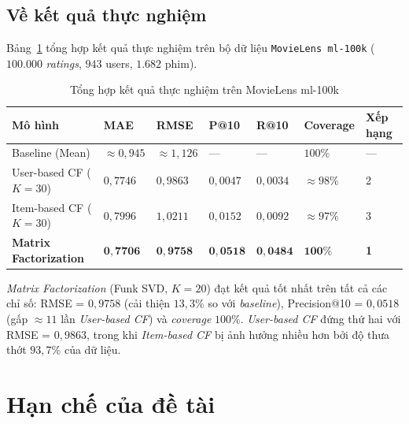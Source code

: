 \documentclass[../BTL.tex]{subfiles}
\begin{document}
\subsection{Về kết quả thực nghiệm}
\label{section:4.1.3}

Bảng~\ref{tab:summary} tổng hợp kết quả thực nghiệm trên bộ dữ liệu
\texttt{MovieLens ml-100k} ($100.000$ \textit{ratings}, $943$ users,
$1.682$ phim).

\begin{table}[H]
    \centering
    \caption{Tổng hợp kết quả thực nghiệm trên MovieLens ml-100k}
    \label{tab:summary}
    \begin{tabular}{lllllll}
        \toprule
        \textbf{Mô hình}
            & \textbf{MAE} & \textbf{RMSE}
            & \textbf{P@10} & \textbf{R@10}
            & \textbf{Coverage} & \textbf{Xếp hạng} \\
        \midrule
        Baseline (Mean)
            & ${\approx}0{,}945$ & ${\approx}1{,}126$
            & --- & ---
            & $100\%$ & --- \\
        User-based CF ($K=30$)
            & $0{,}7746$ & $0{,}9863$
            & $0{,}0047$ & $0{,}0034$
            & ${\approx}98\%$ & 2 \\
        Item-based CF ($K=30$)
            & $0{,}7996$ & $1{,}0211$
            & $0{,}0152$ & $0{,}0092$
            & ${\approx}97\%$ & 3 \\
        \textbf{Matrix Factorization}
            & $\mathbf{0{,}7706}$ & $\mathbf{0{,}9758}$
            & $\mathbf{0{,}0518}$ & $\mathbf{0{,}0484}$
            & $\mathbf{100\%}$ & \textbf{1} \\
        \bottomrule
    \end{tabular}
\end{table}

\textit{Matrix Factorization} (Funk SVD, $K=20$) đạt kết quả tốt nhất trên
tất cả các chỉ số: RMSE = $0{,}9758$ (cải thiện $13{,}3\%$ so với
\textit{baseline}), Precision@10 = $0{,}0518$ (gấp ${\approx}11$ lần
\textit{User-based CF}) và \textit{coverage} $100\%$. \textit{User-based CF}
đứng thứ hai với RMSE = $0{,}9863$, trong khi \textit{Item-based CF} bị ảnh
hưởng nhiều hơn bởi độ thưa thớt $93{,}7\%$ của dữ liệu.

\section{Hạn chế của đề tài}
\label{section:4.2}
\end{document}
